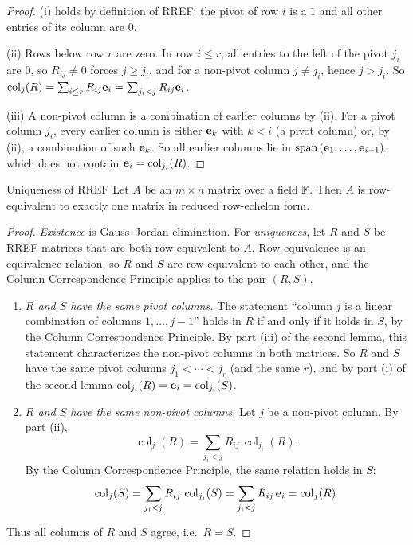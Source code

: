 \documentclass{exam}
\begin{document}
\begin{proof}
  (i) holds by definition of RREF: the pivot of row $i$ is a $1$ and all other entries of its column are $0$.

  (ii) Rows below row $r$ are zero. In row $i \le r$, all entries to the left of the pivot $j_i$ are $0$, so $R_{ij} \neq 0$ forces $j \ge j_i$, and for a non-pivot column $j \ne j_i$, hence $j > j_i$. So $\operatorname{col}_j(R) = \sum_{i \le r} R_{ij} \mathbf{e}_i = \sum_{j_i < j} R_{ij} \mathbf{e}_i$.

  (iii) A non-pivot column is a combination of earlier columns by (ii). For a pivot column $j_i$, every earlier column is either $\mathbf{e}_k$ with $k < i$ (a pivot column) or, by (ii), a combination of such $\mathbf{e}_k$. So all earlier columns lie in $\text{span}\left({\mathbf{e}_1, \dots, \mathbf{e}_{i-1}}\right)$, which does not contain $\mathbf{e}_i = \operatorname{col}_{j_i}(R)$.
\end{proof}

\begin{thm}{Uniqueness of RREF}
  Let $A$ be an $m \times n$ matrix over a field $\mathbb F$. Then $A$ is row-equivalent to exactly one matrix in reduced row-echelon form.
\end{thm}

\begin{proof}
  \emph{Existence} is Gauss--Jordan elimination. For \emph{uniqueness}, let $R$ and $S$ be RREF matrices that are both row-equivalent to $A$. Row-equivalence is an equivalence relation, so $R$ and $S$ are row-equivalent to each other, and the Column Correspondence Principle applies to the pair $(R, S)$.
  \begin{enumerate}[label=\textbf{Step \arabic*.}, leftmargin=*]
    \item \emph{$R$ and $S$ have the same pivot columns.} The statement ``column $j$ is a linear combination of columns $1, \dots, j-1$'' holds in $R$ if and only if it holds in $S$, by the Column Correspondence Principle. By part (iii) of the second lemma, this statement characterizes the non-pivot columns in both matrices. So $R$ and $S$ have the same pivot columns $j_1 < \cdots < j_r$ (and the same $r$), and by part (i) of the second lemma $\operatorname{col}_{j_i}(R) = \mathbf{e}_i = \operatorname{col}_{j_i}(S)$.
    \item \emph{$R$ and $S$ have the same non-pivot columns.} Let $j$ be a non-pivot column. By part (ii),
      \[
        \operatorname{col}_j(R) = \sum_{j_i < j} R_{ij}\, \operatorname{col}_{j_i}(R).
      \]
      By the Column Correspondence Principle, the same relation holds in $S$:
      \[
        \operatorname{col}_j(S) = \sum_{j_i < j} R_{ij}\, \operatorname{col}_{j_i}(S) = \sum_{j_i < j} R_{ij}\, \mathbf{e}_i = \operatorname{col}_j(R).
      \]
  \end{enumerate}
  Thus all columns of $R$ and $S$ agree, i.e.\ $R = S$. \qedhere
\end{proof}
\end{document}
